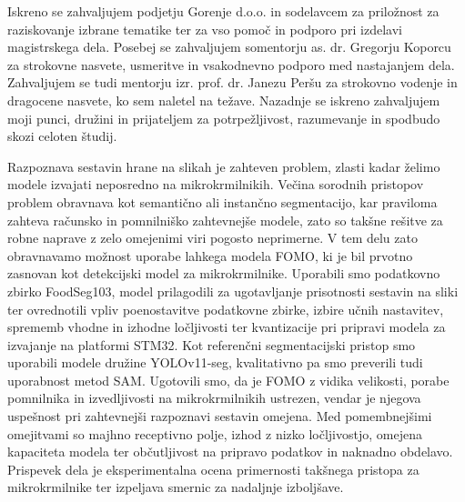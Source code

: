 \documentclass[a4paper,twoside,openright,12pt,slovene]{book}
\date{Ljubljana, \the\year}
\begin{document}
\frontmatter


\thispagestyle{empty}

\praznastran

\maketitle

\thispagestyle{empty}

\thispagestyle{empty}


\zahvala

Iskreno se zahvaljujem podjetju Gorenje d.o.o. in sodelavcem za priložnost za raziskovanje izbrane tematike ter za vso pomoč in podporo pri izdelavi magistrskega dela.
Posebej se zahvaljujem somentorju as. dr. Gregorju Koporcu za strokovne nasvete, usmeritve in vsakodnevno podporo med nastajanjem dela.
Zahvaljujem se tudi mentorju izr. prof. dr. Janezu Peršu za strokovno vodenje in dragocene nasvete, ko sem naletel na težave.
Nazadnje se iskreno zahvaljujem moji punci, družini in prijateljem za potrpežljivost, razumevanje in spodbudo skozi celoten študij.

\povzetek

Razpoznava sestavin hrane na slikah je zahteven problem, zlasti kadar
želimo modele izvajati neposredno na mikrokrmilnikih. Večina sorodnih pristopov
problem obravnava kot semantično ali instančno segmentacijo, kar praviloma
zahteva računsko in pomnilniško zahtevnejše modele, zato so takšne
rešitve za robne naprave z zelo omejenimi viri pogosto neprimerne. V tem delu
zato obravnavamo možnost uporabe lahkega modela FOMO,
ki je bil prvotno zasnovan kot detekcijski model za
mikrokrmilnike. Uporabili smo podatkovno zbirko FoodSeg103, model prilagodili
za ugotavljanje prisotnosti sestavin na sliki ter ovrednotili vpliv
poenostavitve podatkovne zbirke, izbire učnih nastavitev, sprememb vhodne in
izhodne ločljivosti ter kvantizacije pri pripravi modela za izvajanje na
platformi STM32. Kot referenčni segmentacijski pristop smo uporabili modele družine
YOLOv11-seg, kvalitativno pa smo preverili tudi uporabnost metod SAM. Ugotovili
smo, da je FOMO z vidika velikosti, porabe pomnilnika in izvedljivosti na
mikrokrmilnikih ustrezen, vendar je njegova uspešnost pri zahtevnejši razpoznavi
sestavin omejena. Med pomembnejšimi omejitvami so majhno receptivno
polje, izhod z nizko ločljivostjo, omejena kapaciteta modela ter občutljivost na
pripravo podatkov in naknadno obdelavo. Prispevek dela je eksperimentalna ocena
primernosti takšnega pristopa za mikrokrmilnike ter izpeljava smernic za
nadaljnje izboljšave.
\end{document}
